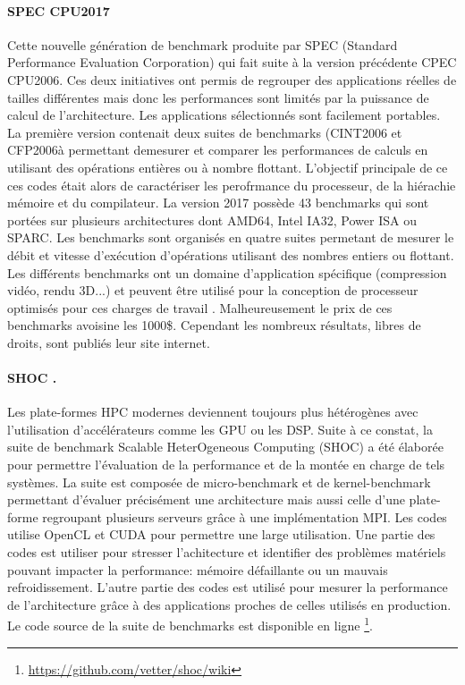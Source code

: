\paragraph{SPEC CPU2017} Cette nouvelle génération de benchmark produite par SPEC (Standard Performance Evaluation Corporation) qui fait suite à la version précédente CPEC CPU2006. Ces deux initiatives ont permis de regrouper des applications réelles de tailles différentes mais donc les performances sont limités par la puissance de calcul de l'architecture. Les applications sélectionnés sont facilement portables. La première version contenait deux suites de benchmarks (CINT2006 et CFP2006à permettant demesurer et comparer les performances de calculs en utilisant des opérations entières ou à nombre flottant. L'objectif principale de ce ces codes était alors de caractériser les perofrmance du processeur, de la hiérachie mémoire et du compilateur. La version 2017 possède 43 benchmarks qui sont portées sur plusieurs architectures dont AMD64, Intel IA32, Power ISA ou SPARC. Les benchmarks sont organisés en quatre suites permetant de mesurer le débit et vitesse d'exécution d'opérations utilisant des nombres entiers ou flottant.  Les différents benchmarks ont un domaine d'application spécifique (compression vidéo, rendu 3D...) et peuvent être utilisé pour la conception de processeur optimisés pour ces charges de travail \cite{Panda2018}. Malheureusement le prix de ces benchmarks avoisine les 1000\$. Cependant les nombreux résultats, libres de droits, sont publiés leur site internet. 

\paragraph{SHOC \cite{danalis2010scalable}.} Les plate-formes HPC modernes deviennent toujours plus hétérogènes avec l'utilisation d'accélérateurs comme les GPU ou les DSP. Suite à ce constat, la suite de benchmark Scalable HeterOgeneous Computing (SHOC) a été élaborée pour permettre l'évaluation de la performance et de la montée en charge de tels systèmes. La suite est composée de micro-benchmark et de kernel-benchmark permettant d'évaluer précisément une architecture mais aussi celle d'une plate-forme regroupant plusieurs serveurs grâce à une implémentation MPI. Les codes utilise OpenCL et CUDA pour permettre une large utilisation. Une partie des codes est utiliser pour stresser l'achitecture et identifier des problèmes matériels pouvant impacter la performance: mémoire défaillante ou un mauvais refroidissement. L'autre partie des codes est utilisé pour mesurer la performance de l'architecture grâce à des applications proches de celles utilisés en production. Le code source de la suite de benchmarks est disponible en ligne \footnote{\url{https://github.com/vetter/shoc/wiki}}.



